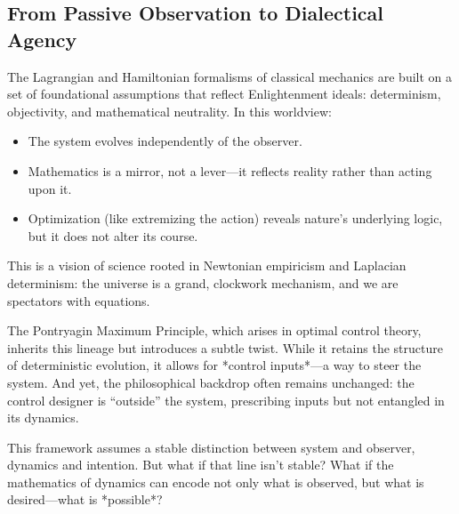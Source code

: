\subsection{From Passive Observation to Dialectical Agency}

The Lagrangian and Hamiltonian formalisms of classical mechanics are built on a set of foundational assumptions that reflect Enlightenment ideals: determinism, objectivity, and mathematical neutrality. In this worldview:

\begin{itemize}
	\item The system evolves independently of the observer.  
	\item Mathematics is a mirror, not a lever—it reflects reality rather than acting upon it.  
	\item Optimization (like extremizing the action) reveals nature’s underlying logic, but it does not alter its course.
\end{itemize}

This is a vision of science rooted in Newtonian empiricism and Laplacian determinism: the universe is a grand, clockwork mechanism, and we are spectators with equations.

The Pontryagin Maximum Principle, which arises in optimal control theory, inherits this lineage but introduces a subtle twist. While it retains the structure of deterministic evolution, it allows for *control inputs*—a way to steer the system. And yet, the philosophical backdrop often remains unchanged: the control designer is “outside” the system, prescribing inputs but not entangled in its dynamics.

This framework assumes a stable distinction between system and observer, dynamics and intention. But what if that line isn't stable? What if the mathematics of dynamics can encode not only what is observed, but what is desired—what is *possible*?